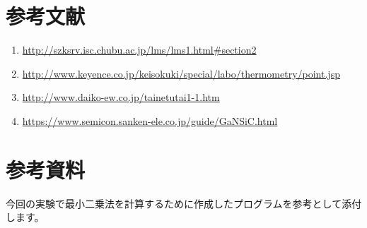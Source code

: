 \documentclass[a4j,twoside,openright,11pt]{jarticle}
\begin{document}
\section{参考文献}
\begin{enumerate}
\item \url{http://szksrv.isc.chubu.ac.jp/lms/lms1.html#section2}
\item \url{http://www.keyence.co.jp/keisokuki/special/labo/thermometry/point.jsp}
\item \url{http://www.daiko-ew.co.jp/tainetutai1-1.htm}
\item \url{https://www.semicon.sanken-ele.co.jp/guide/GaNSiC.html}
\end{enumerate}

\section{参考資料}
今回の実験で最小二乗法を計算するために作成したプログラムを参考として添付します。
\small
\end{document}
